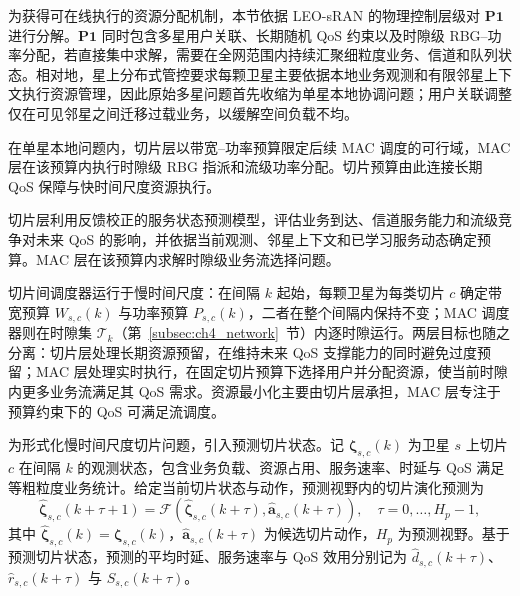 为获得可在线执行的资源分配机制，本节依据 LEO-sRAN 的物理控制层级对 $\mathbf{P1}$ 进行分解。$\mathbf{P1}$ 同时包含多星用户关联、长期随机 QoS 约束以及时隙级 RBG--功率分配，若直接集中求解，需要在全网范围内持续汇聚细粒度业务、信道和队列状态。相对地，星上分布式管控要求每颗卫星主要依据本地业务观测和有限邻星上下文执行资源管理，因此原始多星问题首先收缩为单星本地协调问题；用户关联调整仅在可见邻星之间迁移过载业务，以缓解空间负载不均。

在单星本地问题内，切片层以带宽--功率预算限定后续 MAC 调度的可行域，MAC 层在该预算内执行时隙级 RBG 指派和流级功率分配。切片预算由此连接长期 QoS 保障与快时间尺度资源执行。

切片层利用反馈校正的服务状态预测模型，评估业务到达、信道服务能力和流级竞争对未来 QoS 的影响，并依据当前观测、邻星上下文和已学习服务动态确定预算。MAC 层在该预算内求解时隙级业务流选择问题。

切片间调度器运行于慢时间尺度：在间隔 $k$ 起始，每颗卫星为每类切片 $c$ 确定带宽预算 $W_{s,c}(k)$ 与功率预算 $P_{s,c}(k)$，二者在整个间隔内保持不变；MAC 调度器则在时隙集 $\mathcal T_k$（第~\ref{subsec:ch4_network}~节）内逐时隙运行。两层目标也随之分离：切片层处理长期资源预留，在维持未来 QoS 支撑能力的同时避免过度预留；MAC 层处理实时执行，在固定切片预算下选择用户并分配资源，使当前时隙内更多业务流满足其 QoS 需求。资源最小化主要由切片层承担，MAC 层专注于预算约束下的 QoS 可满足流调度。

为形式化慢时间尺度切片问题，引入预测切片状态。记 $\boldsymbol\zeta_{s,c}(k)$ 为卫星 $s$ 上切片 $c$ 在间隔 $k$ 的观测状态，包含业务负载、资源占用、服务速率、时延与 QoS 满足等粗粒度业务统计。给定当前切片状态与动作，预测视野内的切片演化预测为
\begin{equation}\label{eq:ch4_predtrans}
\hat{\boldsymbol\zeta}_{s,c}(k+\tau+1)=\mathcal F\!\left(\hat{\boldsymbol\zeta}_{s,c}(k+\tau),\hat{\boldsymbol a}_{s,c}(k+\tau)\right),\quad \tau=0,\dots,H_p-1,
\end{equation}
其中 $\hat{\boldsymbol\zeta}_{s,c}(k)=\boldsymbol\zeta_{s,c}(k)$，$\hat{\boldsymbol a}_{s,c}(k+\tau)$ 为候选切片动作，$H_p$ 为预测视野。基于预测切片状态，预测的平均时延、服务速率与 QoS 效用分别记为 $\hat d_{s,c}(k+\tau)$、$\hat r_{s,c}(k+\tau)$ 与 $\hat S_{s,c}(k+\tau)$。

